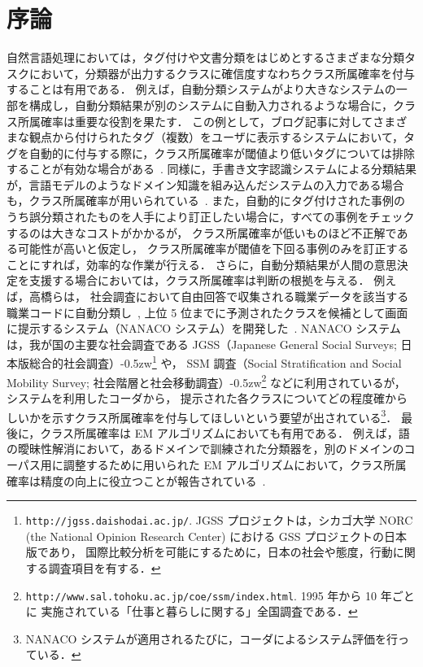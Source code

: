 \documentclass[japanese]{jnlp_1.4}
\begin{document}
\maketitle


\section{序論}\label{sec:hajime}

自然言語処理においては，タグ付けや文書分類をはじめとするさまざまな分類タスクにおいて，分類器が出力するクラスに確信度すなわちクラス所属確率を付与することは有用である．
例えば，自動分類システムがより大きなシステムの一部を構成し，自動分類結果が別のシステムに自動入力されるような場合に，クラス所属確率は重要な役割を果たす．
この例として，ブログ記事に対してさまざまな観点から付けられたタグ（複数）をユーザに表示するシステムにおいて，タグを自動的に付与する際に，クラス所属確率が閾値より低いタグについては排除することが有効な場合がある~\cite{Ohkura06}.  同様に，手書き文字認識システムによる分類結果が，言語モデルのようなドメイン知識を組み込んだシステムの入力である場合も，クラス所属確率が用いられている~\cite{Zadrozny02}. 
また，自動的にタグ付けされた事例のうち誤分類されたものを人手により訂正したい場合に，すべての事例をチェックするのは大きなコストがかかるが，
クラス所属確率が低いものほど不正解である可能性が高いと仮定し，
クラス所属確率が閾値を下回る事例のみを訂正することにすれば，効率的な作業が行える．
さらに，自動分類結果が人間の意思決定を支援する場合においては，クラス所属確率は判断の根拠を与える．
例えば，高橋らは，
社会調査において自由回答で収集される職業データを該当する職業コードに自動分類し~\cite{Takahashi05a,Takahashi05c}, 
上位 5 位までに予測されたクラスを候補として画面に提示するシステム（NANACO システム）を開発した~\cite{Takahashi05b}.  
NANACO システムは，我が国の主要な社会調査である JGSS（Japanese General Social Surveys; 日本版総合的社会調査）\kern-0.5zw\footnote{
	\texttt{http://jgss.daishodai.ac.jp/}. JGSS プロジェクトは，シカゴ大学 NORC 
	(the National Opinion Research Center) における GSS プロジェクトの日本版であり，
	国際比較分析を可能にするために，日本の社会や態度，行動に関する調査項目を有する．
} や，
SSM 調査（Social Stratification and Social Mobility Survey; 
社会階層と社会移動調査）\kern-0.5zw\footnote{
	\texttt{http://www.sal.tohoku.ac.jp/coe/ssm/index.html}.  1995 年から 10 年ごとに
	実施されている「仕事と暮らしに関する」全国調査である．
} などに利用されているが，
システムを利用したコーダから，
提示された各クラスについてどの程度確からしいかを示すクラス所属確率を付与してほしいという要望が出されている\footnote{
	NANACO システムが適用されるたびに，コーダによるシステム評価を行っている．
}．
最後に，クラス所属確率は EM アルゴリズムにおいても有用である．
例えば，語の曖昧性解消において，あるドメインで訓練された分類器を，別のドメインのコーパス用に調整するために用いられた EM アルゴリズムにおいて，クラス所属確率は精度の向上に役立つことが報告されている~\cite{Chan06}.  
\end{document}
